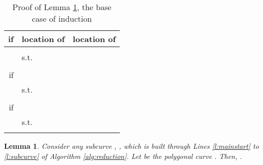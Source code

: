 \documentclass[12pt]{dalthesis}
\newtheorem{lemma}[theorem]{Lemma}
\begin{document}
\begin{table}[h]
\centering
\begin{tabular}{ r | l | l  }
if    & location of  & location of   
 \\
\hline
    
&   &   \\
&  				  s.t.   & \\

&   & 	      \\

\hline
if  
&   &   \\
&  				  s.t.   & \\

&  &  \\

\hline
if  &  &   \\
&  				  s.t.   & \\
&  &  \\

\end{tabular}
\vspace{0.2 in}
\caption{Proof of Lemma \ref{lemma:PathA}, the base case of induction}
\label{tab:BaseCasePathA}
\end{table}





\begin{lemma}\label{lemma:PathA}
Consider any subcurve , ,  
which is built through Lines \ref{l:mainstart} to \ref{l:subcurve} 
of Algorithm \ref{alg:reduction}. Let  be the polygonal curve  . 
Then, .
\end{lemma}
\end{document}
